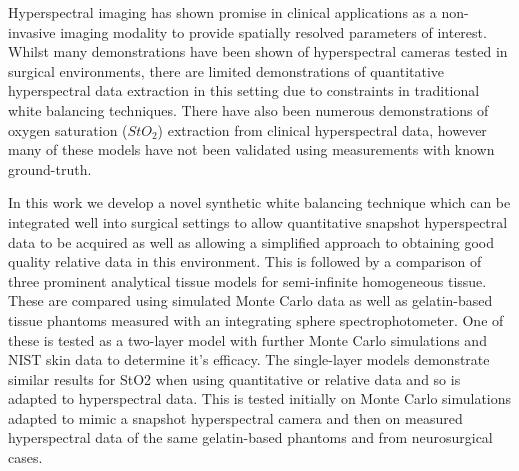 Hyperspectral imaging has shown promise in clinical applications as a non-invasive imaging modality to provide spatially resolved parameters of interest. Whilst many demonstrations have been shown of hyperspectral cameras tested in surgical environments, there are limited demonstrations of quantitative hyperspectral data extraction in this setting due to constraints in traditional white balancing techniques. There have also been numerous demonstrations of oxygen saturation ($StO_2$) extraction from clinical hyperspectral data, however many of these models have not been validated using measurements with known ground-truth.

In this work we develop a novel synthetic white balancing technique which can be integrated well into surgical settings to allow quantitative snapshot hyperspectral data to be acquired as well as allowing a simplified approach to obtaining good quality relative data in this environment. This is followed by a comparison of three prominent analytical tissue models for semi-infinite homogeneous tissue. These are compared using simulated Monte Carlo data as well as gelatin-based tissue phantoms measured with an integrating sphere spectrophotometer. One of these is tested as a two-layer model with further Monte Carlo simulations and NIST skin data to determine it’s efficacy. The single-layer models demonstrate similar results for StO2 when using quantitative or relative data and so is adapted to hyperspectral data. This is tested initially on Monte Carlo simulations adapted to mimic a snapshot hyperspectral camera and then on measured hyperspectral data of the same gelatin-based phantoms and from neurosurgical cases.